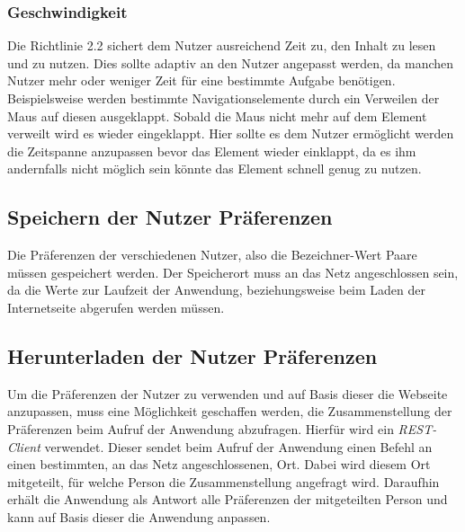 \documentclass[12pt, paper=a4, bibtotoc, toc=listof, headsepline=true]{scrreprt}
\begin{document}
			\subsubsection{Geschwindigkeit}
			Die Richtlinie 2.2 sichert dem Nutzer ausreichend Zeit zu, den Inhalt zu lesen und zu nutzen. Dies sollte adaptiv an den Nutzer angepasst werden, da manchen Nutzer mehr oder weniger Zeit für eine bestimmte Aufgabe benötigen. Beispielsweise werden bestimmte Navigationselemente durch ein Verweilen der Maus auf diesen ausgeklappt. Sobald die Maus nicht mehr auf dem Element verweilt wird es wieder eingeklappt. Hier sollte es dem Nutzer ermöglicht werden die Zeitspanne anzupassen bevor das Element wieder einklappt, da es ihm andernfalls nicht möglich sein könnte das Element schnell genug zu nutzen.
		
			
		\subsection{Speichern der Nutzer Präferenzen}
		Die Präferenzen der verschiedenen Nutzer, also die Bezeichner-Wert Paare müssen gespeichert werden. Der Speicherort muss an das Netz angeschlossen sein, da die Werte zur Laufzeit der Anwendung, beziehungsweise beim Laden der Internetseite abgerufen werden müssen.
		
		\subsection{Herunterladen der Nutzer Präferenzen}
		Um die Präferenzen der Nutzer zu verwenden und auf Basis dieser die Webseite anzupassen, muss eine Möglichkeit geschaffen werden, die Zusammenstellung der Präferenzen beim Aufruf der Anwendung abzufragen. Hierfür wird ein \emph{REST-Client} verwendet. Dieser sendet beim Aufruf der Anwendung einen Befehl an einen bestimmten, an das Netz angeschlossenen, Ort. Dabei wird diesem Ort mitgeteilt, für welche Person die Zusammenstellung angefragt wird. Daraufhin erhält die Anwendung als Antwort alle Präferenzen der mitgeteilten Person und kann auf Basis dieser die Anwendung anpassen.
\end{document}
